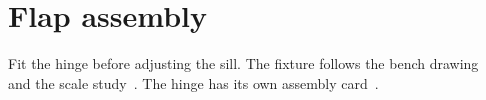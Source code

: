 \documentclass{article}
\begin{document}
\section*{Flap assembly}
Fit the hinge before adjusting the sill.
The fixture follows the bench drawing~\cite{bench} and the scale study~\cite{scale}. The hinge has its own assembly card~\cite{flap}.
\nocite{atlas,guide,lining}

\end{document}
